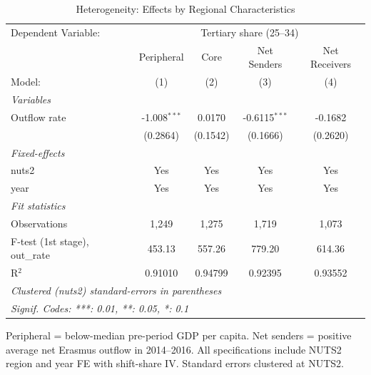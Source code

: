 \begin{table}[htbp]
   \caption{\label{tab:heterogeneity} Heterogeneity: Effects by Regional Characteristics}
   \centering
   \scriptsize
   \begin{tabular}{lcccc}
      \tabularnewline \midrule \midrule
      Dependent Variable: & \multicolumn{4}{c}{Tertiary share (25--34)}\\
                                     & Peripheral     & Core     & Net Senders     & Net Receivers \\   
      Model:                         & (1)            & (2)      & (3)             & (4)\\  
      \midrule
      \emph{Variables}\\
      Outflow rate                   & -1.008$^{***}$ & 0.0170   & -0.6115$^{***}$ & -0.1682\\   
                                     & (0.2864)       & (0.1542) & (0.1666)        & (0.2620)\\   
      \midrule
      \emph{Fixed-effects}\\
      nuts2                          & Yes            & Yes      & Yes             & Yes\\  
      year                           & Yes            & Yes      & Yes             & Yes\\  
      \midrule
      \emph{Fit statistics}\\
      Observations                   & 1,249          & 1,275    & 1,719           & 1,073\\  
      F-test (1st stage), out\_rate  & 453.13         & 557.26   & 779.20          & 614.36\\  
      R$^2$                          & 0.91010        & 0.94799  & 0.92395         & 0.93552\\  
      \midrule \midrule
      \multicolumn{5}{l}{\emph{Clustered (nuts2) standard-errors in parentheses}}\\
      \multicolumn{5}{l}{\emph{Signif. Codes: ***: 0.01, **: 0.05, *: 0.1}}\\
   \end{tabular}
   
   \par \raggedright 
   Peripheral = below-median pre-period GDP per capita. Net senders = positive average net Erasmus outflow in 2014--2016. All specifications include NUTS2 region and year FE with shift-share IV. Standard errors clustered at NUTS2.
\end{table}
